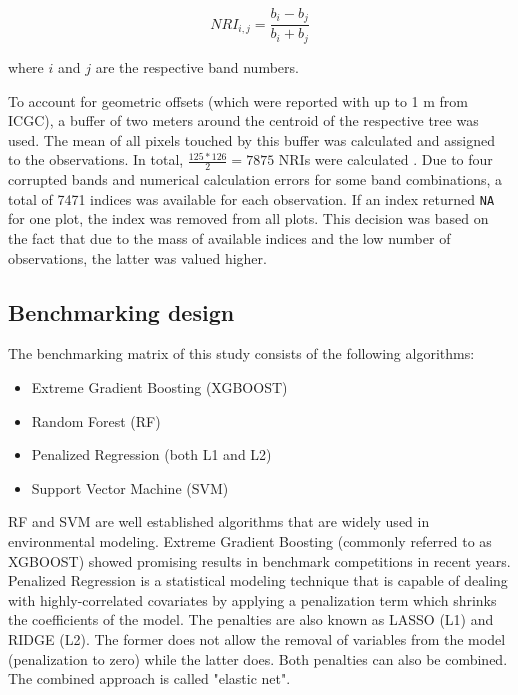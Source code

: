 \documentclass[review]{elsarticle}
\begin{document}
\begin{equation}
	NRI_{i,j} = \frac{b_{i} - b_{j}}{b_{i} + b_{j}}
\end{equation}

\noindent
where $i$ and $j$ are the respective band numbers.

\bigbreak

\noindent To account for geometric offsets (which were reported with up to 1 m from \ac{ICGC}), a buffer of two meters around the centroid of the respective tree was used.
The mean of all pixels touched by this buffer was calculated and assigned to the observations.
In total, $\frac{125*126}{2} = 7875$ NRIs were calculated .
Due to four corrupted bands and numerical calculation errors for some band combinations, a total of 7471 indices was available for each observation.
If an index returned \texttt{NA} for one plot, the index was removed from all plots.
This decision was based on the fact that due to the mass of available indices and the low number of observations, the latter was valued higher.

\subsection{Benchmarking design}

The benchmarking matrix of this study consists of the following algorithms:

\begin{itemize}
	\item  Extreme Gradient Boosting (\ac{XGBOOST})
	\item  Random Forest (\ac{RF})
	\item  Penalized Regression (both L1 and L2)
	\item  Support Vector Machine (\ac{SVM})
\end{itemize}

\ac{RF} and {SVM} are well established algorithms that are widely used in environmental modeling.
Extreme Gradient Boosting (commonly referred to as \ac{XGBOOST}) showed promising results in benchmark competitions in recent years.
Penalized Regression is a statistical modeling technique that is capable of dealing with highly-correlated covariates by applying a penalization term which shrinks the coefficients of the model.
The penalties are also known as LASSO (L1) and RIDGE (L2).
The former does not allow the removal of variables from the model (penalization to zero) while the latter does.
Both penalties can also be combined.
The combined approach is called "elastic net".
\end{document}
